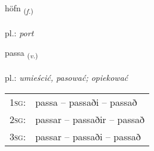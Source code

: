 \documentclass[frontgrid, backgrid]{flacards}\usepackage[]{graphicx}\usepackage[]{xcolor}
\begin{document}
\renewcommand{\blhead}{\vskip5pt {\small\bfseries\footnotesize Nafnorð | Noun }}
\renewcommand{\bcfoot}{\vskip5pt \hspace{2pt}{\small\bfseries\footnotesize 2K}}


{höfn \small{\textsubscript{(\textit{f.})}} \\[1ex] %
\textphonetic{[hœpn̥]} \\
pl.: \emph{port} \\  [2ex]
\renewcommand*{\arraystretch}{0.8}
}

\renewcommand{\flhead}{\vskip5pt \fboxsep=0pt {\small\bfseries\footnotesize Sagnorð | Verb}}
\renewcommand{\fcfoot}{\vskip5pt \fboxsep=0pt \hspace{2pt}{\small\bfseries\footnotesize 2K}}

\renewcommand{\blhead}{\vskip5pt {\small\bfseries\footnotesize Sagnorð | Verb }}
\renewcommand{\bcfoot}{\vskip5pt \hspace{2pt}{\small\bfseries\footnotesize 2K}}


{passa \small{\textsubscript{(\textit{v.})}} \\[1ex] %
\textphonetic{[pʰasa]} \\
pl.: \emph{umieścić, pasować; opiekować} \\  [2ex]
\renewcommand*{\arraystretch}{0.8}
\begin{tabular}{p{1cm}l}
\textsc{1sg}: & passa -- passaði -- passað \\ 
\textsc{2sg}: & passar -- passaðir -- passað \\ 
\textsc{3sg}: & passar -- passaði -- passað \\ 
\end{tabular}
}

\renewcommand{\flhead}{\vskip5pt \fboxsep=0pt {\small\bfseries\footnotesize Sagnorð | Verb}}
\renewcommand{\fcfoot}{\vskip5pt \fboxsep=0pt \hspace{2pt}{\small\bfseries\footnotesize 2K}}
\end{document}
